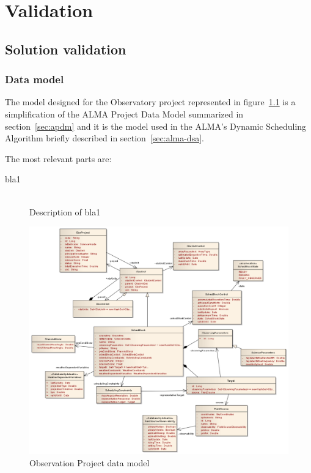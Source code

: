 \part{Validation}

\chapter{Solution validation}

\section {Data model}

The model designed for the Observatory project represented in figure~\ref{fig:datamodel-obsproject} is a simplification of the ALMA Project Data Model summarized in section~\ref{sec:apdm} and it is the model used in the ALMA's Dynamic Scheduling Algorithm briefly described in section~\ref{sec:alma-dsa}.

The most relevant parts are: 
\begin{description}
\item[bla1] \hfill \\
Description of bla1
\end{description}

\begin{figure}[]	
\begin{center}
\includegraphics[width=1.15\textwidth]{images/ObsProject}
\caption{Observation Project data model}
\end{center}
\label{fig:datamodel-obsproject}
\end{figure}

